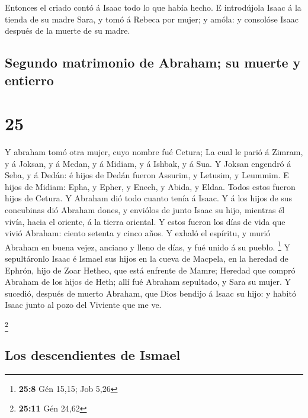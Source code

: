  Entonces el criado contó á Isaac todo lo que había hecho.
 E introdújola Isaac á la tienda de su madre Sara, y tomó á
Rebeca por mujer; y amóla: y consolóse Isaac después de la muerte de su
madre.

\hypertarget{segundo-matrimonio-de-abraham-su-muerte-y-entierro}{%
\subsection{Segundo matrimonio de Abraham; su muerte y
entierro}\label{segundo-matrimonio-de-abraham-su-muerte-y-entierro}}

\hypertarget{section-24}{%
\section{25}\label{section-24}}

 Y abraham tomó otra mujer, cuyo nombre fué Cetura;
 La cual le parió á Zimram, y á Joksan, y á Medan, y á
Midiam, y á Ishbak, y á Sua.  Y Joksan engendró á Seba, y á
Dedán: é hijos de Dedán fueron Assurim, y Letusim, y Leummim.
 E hijos de Midiam: Epha, y Epher, y Enech, y Abida, y
Eldaa. Todos estos fueron hijos de Cetura.  Y Abraham dió
todo cuanto tenía á Isaac.  Y á los hijos de sus concubinas
dió Abraham dones, y enviólos de junto Isaac su hijo, mientras él vivía,
hacia el oriente, á la tierra oriental.  Y estos fueron los
días de vida que vivió Abraham: ciento setenta y cinco años.
 Y exhaló el espíritu, y murió Abraham en buena vejez,
anciano y lleno de días, y fué unido á su pueblo. \footnote{\textbf{25:8}
  Gén 15,15; Job 5,26}  Y sepultáronlo Isaac é Ismael sus
hijos en la cueva de Macpela, en la heredad de Ephrón, hijo de Zoar
Hetheo, que está enfrente de Mamre;  Heredad que compró
Abraham de los hijos de Heth; allí fué Abraham sepultado, y Sara su
mujer.  Y sucedió, después de muerto Abraham, que Dios
bendijo á Isaac su hijo: y habitó Isaac junto al pozo del Viviente que
me ve.

\footnote{\textbf{25:11} Gén 24,62}

\hypertarget{los-descendientes-de-ismael}{%
\subsection{Los descendientes de
Ismael}\label{los-descendientes-de-ismael}}

